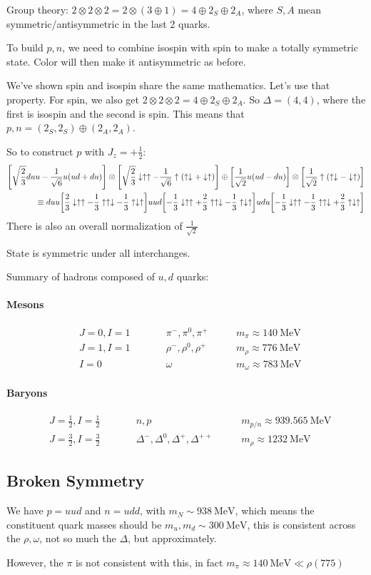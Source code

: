 Group theory: $2\otimes2\otimes2=2\otimes(3\oplus1)=4\oplus2_S\oplus2_A$, where $S,A$ mean symmetric/antisymmetric in the last 2 quarks.

To build $p,n$, we need to combine isospin with spin to make a totally symmetric state. Color will then make it antisymmetric as before.

We've shown spin and isospin share the same mathematics. Let's use that property. For spin, we also get $2\otimes2\otimes2=4\oplus2_S\oplus2_A$. So $\Delta=(4,4)$, where the first is isospin and the second is spin. This means that $p,n=(2_S,2_S)\oplus(2_A,2_A)$.

So to construct $p$ with $J_z=+\frac12$:
\begin{align*}
  \qty[\sqrt{\frac23}duu-\frac1{\sqrt{6}}u(ud+du)]\otimes
  \qty[\sqrt{\frac23}\downarrow\uparrow\uparrow-\frac1{\sqrt{6}}\uparrow(\uparrow\downarrow+\downarrow\uparrow)]\oplus
  \qty[\frac1{\sqrt{2}}u(ud-du)]\otimes
  \qty[\frac1{\sqrt{2}}\uparrow(\uparrow\downarrow-\downarrow\uparrow)]\\
  \equiv duu\qty[\frac23\downarrow\uparrow\uparrow-\frac13\uparrow\uparrow\downarrow-\frac13\uparrow\downarrow\uparrow]
  uud\qty[-\frac13\downarrow\uparrow\uparrow+\frac23\uparrow\uparrow\downarrow-\frac13\uparrow\downarrow\uparrow]
  udu\qty[-\frac13\downarrow\uparrow\uparrow-\frac13\uparrow\uparrow\downarrow+\frac23\uparrow\downarrow\uparrow]
\end{align*}
There is also an overall normalization of $\frac1{\sqrt{2}}$

State is symmetric under all interchanges.

Summary of hadrons composed of $u,d$ quarks:

\paragraph{Mesons}
\begin{align*}
  &J=0,I=1&\qquad & \pi^-,\pi^0,\pi^+   \qquad &m_\pi\approx\SI{140}{\MeV}\\
  &J=1,I=1&\qquad & \rho^-,\rho^0,\rho^+\qquad &m_\rho\approx\SI{776}{\MeV}\\
  &I=0    &\qquad & \omega              \qquad &m_\omega\approx\SI{783}{\MeV}
\end{align*}

\paragraph{Baryons}
\begin{align*}
  &J=\frac12,I=\frac12 &\qquad
  & n,p \qquad
  &m_{p/n}\approx\SI{939.565}{\MeV}\\
  &J=\frac32,I=\frac32 &\qquad
  & \Delta^-,\Delta^0,\Delta^+,\Delta^{++}\qquad
  &m_\rho\approx\SI{1232}{\MeV}
\end{align*}

\subsection{Broken Symmetry}
We have $p=uud$ and $n=udd$, with $m_N\sim\SI{938}{\MeV}$, which means the constituent quark masses should be $m_u,m_d\sim\SI{300}{\MeV}$, this is consistent across the $\rho,\omega$, not so much the $\Delta$, but approximately.

However, the $\pi$ is not consistent with this, in fact $m_\pi\approx\SI{140}{\MeV}\ll\rho(775)$